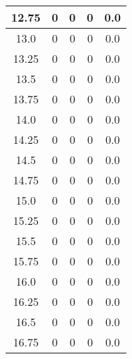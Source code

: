 \documentclass[letterpaper, 12pt]{article}
\begin{document}
\begin{longtable}{|c|c|c|c|c|}
12.75 & 0 & 0 & 0 & 0.0 \\
\hline
13.0 & 0 & 0 & 0 & 0.0 \\
\hline
13.25 & 0 & 0 & 0 & 0.0 \\
\hline
13.5 & 0 & 0 & 0 & 0.0 \\
\hline
13.75 & 0 & 0 & 0 & 0.0 \\
\hline
14.0 & 0 & 0 & 0 & 0.0 \\
\hline
14.25 & 0 & 0 & 0 & 0.0 \\
\hline
14.5 & 0 & 0 & 0 & 0.0 \\
\hline
14.75 & 0 & 0 & 0 & 0.0 \\
\hline
15.0 & 0 & 0 & 0 & 0.0 \\
\hline
15.25 & 0 & 0 & 0 & 0.0 \\
\hline
15.5 & 0 & 0 & 0 & 0.0 \\
\hline
15.75 & 0 & 0 & 0 & 0.0 \\
\hline
16.0 & 0 & 0 & 0 & 0.0 \\
\hline
16.25 & 0 & 0 & 0 & 0.0 \\
\hline
16.5 & 0 & 0 & 0 & 0.0 \\
\hline
16.75 & 0 & 0 & 0 & 0.0 \\
\hline
\end{longtable}
\end{document}
